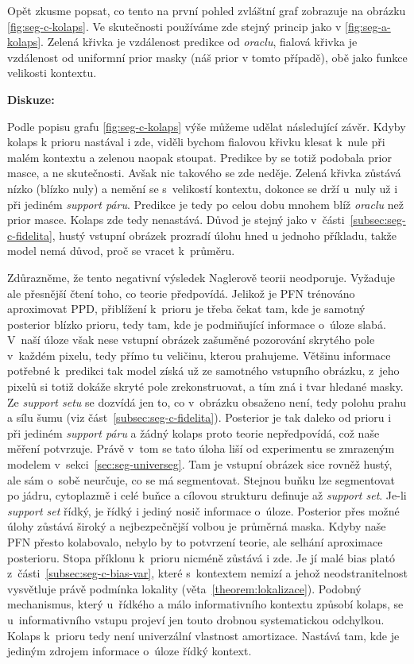 Opět zkusme popsat, co tento na první pohled zvláštní graf zobrazuje na obrázku \ref{fig:seg-c-kolaps}.
Ve skutečnosti používáme zde stejný princip jako v \ref{fig:seg-a-kolaps}.
Zelená křivka je vzdálenost predikce od \emph{oraclu}, fialová křivka je vzdálenost od uniformní prior masky (náš prior v tomto případě), obě jako funkce velikosti kontextu.
\par

\textbf{Diskuze:}

Podle popisu grafu \ref{fig:seg-c-kolaps} výše můžeme udělat následující závěr.
Kdyby kolaps k prioru nastával i zde, viděli bychom fialovou křivku klesat k~nule při malém kontextu a zelenou naopak stoupat.
Predikce by se totiž podobala prior masce, a ne skutečnosti.
Avšak nic takového se zde neděje.
Zelená křivka zůstává nízko (blízko nuly) a nemění se s~velikostí kontextu, dokonce se drží u~nuly už i při jediném \emph{support páru}.
Predikce je tedy po celou dobu mnohem blíž \emph{oraclu} než prior masce.
Kolaps zde tedy nenastává.
Důvod je stejný jako v~části~\ref{subsec:seg-c-fidelita}, hustý vstupní obrázek prozradí úlohu hned u jednoho příkladu, takže model nemá důvod, proč se vracet k~průměru.
\par

Zdůrazněme, že tento negativní výsledek Naglerově teorii neodporuje.
Vyžaduje ale přesnější čtení toho, co teorie předpovídá.
Jelikož je PFN trénováno aproximovat PPD, přiblížení k~prioru je třeba čekat tam, kde je samotný posterior blízko prioru, tedy tam, kde je podmiňující informace o~úloze slabá.
V~naší úloze však nese vstupní obrázek zašuměné pozorování skrytého pole v~každém pixelu, tedy přímo tu veličinu, kterou prahujeme.
Většinu informace potřebné k~predikci tak model získá už ze samotného vstupního obrázku, z~jeho pixelů si totiž dokáže skryté pole zrekonstruovat, a tím zná i tvar hledané masky.
Ze \emph{support setu} se dozvídá jen to, co v~obrázku obsaženo není, tedy polohu prahu a sílu šumu (viz část~\ref{subsec:seg-c-fidelita}).
Posterior je tak daleko od prioru i při jediném \emph{support páru} a žádný kolaps proto teorie nepředpovídá, což naše měření potvrzuje.
Právě v~tom se tato úloha liší od experimentu se zmrazeným modelem v~sekci~\ref{sec:seg-universeg}.
Tam je vstupní obrázek sice rovněž hustý, ale sám o~sobě neurčuje, co se má segmentovat.
Stejnou buňku lze segmentovat po jádru, cytoplazmě i celé buňce a cílovou strukturu definuje až \emph{support set}.
Je-li \emph{support set} řídký, je řídký i jediný nosič informace o~úloze.
Posterior přes možné úlohy zůstává široký a nejbezpečnější volbou je průměrná maska.
Kdyby naše PFN přesto kolabovalo, nebylo by to potvrzení teorie, ale selhání aproximace posterioru.
Stopa příklonu k~prioru nicméně zůstává i zde.
Je jí malé bias plató z~části~\ref{subsec:seg-c-bias-var}, které s~kontextem nemizí a jehož neodstranitelnost vysvětluje právě podmínka lokality (věta~\ref{theorem:lokalizace}).
Podobný mechanismus, který u~řídkého a málo informativního kontextu způsobí kolaps, se u~informativního vstupu projeví jen touto drobnou systematickou odchylkou.
Kolaps k~prioru tedy není univerzální vlastnost amortizace.
Nastává tam, kde je jediným zdrojem informace o~úloze řídký kontext.
\par

